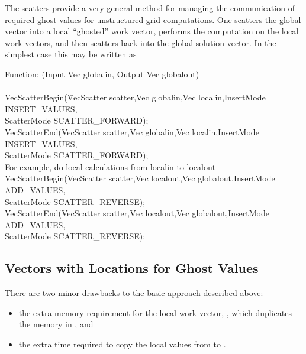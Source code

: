The scatters provide a very general method for managing the communication of 
required ghost values for unstructured grid computations. One scatters
the global vector into a local ``ghosted'' work vector, performs the computation
on the local work vectors, and then scatters back into the global solution 
vector. In the simplest case this may be written as
\begin{tabbing}
   Function: (Input Vec globalin, Output Vec globalout)\\
\\
  VecScatterBegin(\=VecScatter scatter,Vec globalin,Vec localin,InsertMode INSERT_VALUES,\\
                 \>         ScatterMode SCATTER_FORWARD);\\
  VecScatterEnd(VecScatter scatter,Vec globalin,Vec localin,InsertMode INSERT_VALUES,\\
                 \>       ScatterMode SCATTER_FORWARD);\\
  \trl{/*} For example, do local calculations from localin to localout \trl{*/} \\
  VecScatterBegin(VecScatter scatter,Vec localout,Vec globalout,InsertMode ADD_VALUES,\\
                 \>         ScatterMode SCATTER_REVERSE);\\
  VecScatterEnd(VecScatter scatter,Vec localout,Vec globalout,InsertMode ADD_VALUES,\\
                 \>       ScatterMode SCATTER_REVERSE);
\end{tabbing}

\subsection{Vectors with Locations for Ghost Values}


There are two minor drawbacks to the basic approach described above:
\begin{itemize}
\item the extra memory requirement for the local work vector, , which
      duplicates the memory in , and
\item the extra time required to copy the local values from  to 
      .
\end{itemize}

